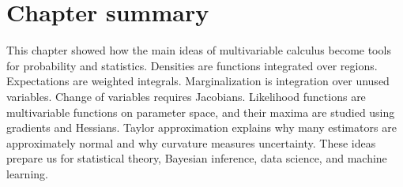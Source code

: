 \documentclass[11pt,oneside]{book}
\begin{document}
\section{Chapter summary}

This chapter showed how the main ideas of multivariable calculus become tools for probability and statistics. Densities are functions integrated over regions. Expectations are weighted integrals. Marginalization is integration over unused variables. Change of variables requires Jacobians. Likelihood functions are multivariable functions on parameter space, and their maxima are studied using gradients and Hessians. Taylor approximation explains why many estimators are approximately normal and why curvature measures uncertainty. These ideas prepare us for statistical theory, Bayesian inference, data science, and machine learning.
\end{document}
